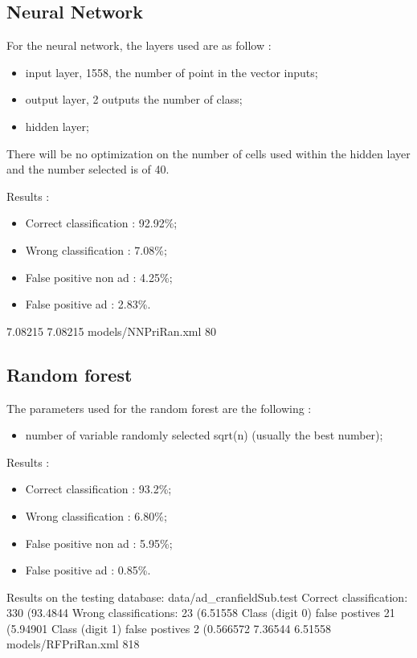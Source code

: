 \subsection{Neural Network}
For the neural network, the layers used are as follow :
  \begin{itemize}
    \item input layer, 1558, the number of point in the vector inputs;
    \item output layer, 2 outputs the number of class;
    \item hidden layer;
  \end{itemize}
  There will be no optimization on the number of cells used within the hidden layer and the number selected is of 40.

  Results :
  \begin{itemize}
    \item Correct classification : 92.92\%;
    \item Wrong classification : 7.08\%;
    \item False positive non ad : 4.25\%;
    \item False positive ad : 2.83\%.
  \end{itemize}
  7.08215
  7.08215
  models/NNPriRan.xml
  80

\subsection{Random forest}
The parameters used for the random forest are the following :
  \begin{itemize}
    \item number of variable randomly selected sqrt(n) (usually the best number);
  \end{itemize}
Results :
\begin{itemize}
  \item Correct classification : 93.2\%;
  \item Wrong classification : 6.80\%;
  \item False positive non ad : 5.95\%;
  \item False positive ad : 0.85\%.
\end{itemize}

Results on the testing database: data/ad\_cranfieldSub.test
	Correct classification: 330 (93.4844%
	Wrong classifications: 23 (6.51558%
	Class (digit 0) false postives 	21 (5.94901%
	Class (digit 1) false postives 	2 (0.566572%
7.36544
6.51558
models/RFPriRan.xml
818
